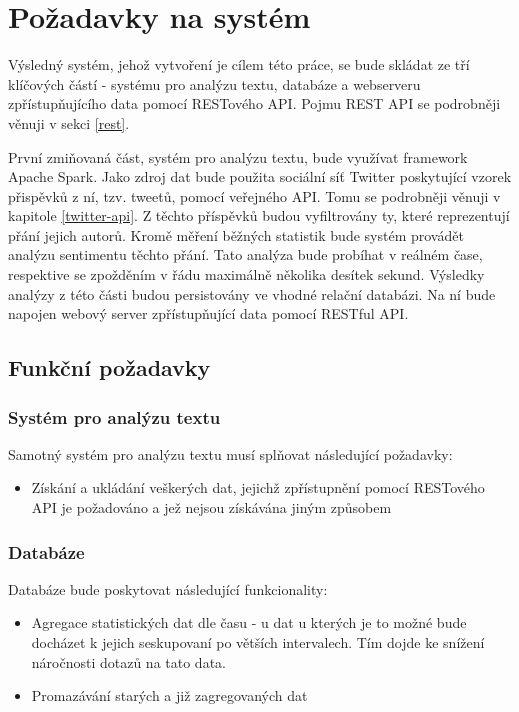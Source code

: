 \documentclass[thesis=B,czech]{FITthesis}[2012/06/26]
\begin{document}
\section{Požadavky na systém}
	Výsledný systém, jehož vytvoření je cílem této práce, se bude skládat ze tří klíčových částí - systému pro analýzu textu, databáze a webserveru zpřístupňujícího data pomocí RESTového API. Pojmu REST API se podrobněji věnuji v sekci \ref{rest}. 
	
	 První zmiňovaná část, systém pro analýzu textu, bude využívat framework Apache Spark. Jako zdroj dat bude použita sociální síť Twitter poskytující vzorek přispěvků z ní, tzv. tweetů, pomocí veřejného API. Tomu se podrobněji věnuji v kapitole \ref{twitter-api}. Z těchto příspěvků budou vyfiltrovány ty, které reprezentují přání jejich autorů. Kromě měření běžných statistik bude systém provádět analýzu sentimentu těchto přání. Tato analýza bude probíhat v reálném čase, respektive se zpožděním v řádu maximálně několika desítek sekund.  Výsledky analýzy z této části budou persistovány ve vhodné relační databázi. Na ní bude napojen webový server zpřístupňující data pomocí RESTful API. 

\subsection{Funkční požadavky}
\label{pozadavky}
\subsubsection{Systém pro analýzu textu}
Samotný systém pro analýzu textu musí splňovat následující požadavky:
\begin{itemize}
\item Získání a ukládání veškerých dat, jejichž zpřístupnění pomocí RESTového API je požadováno a jež nejsou získávána jiným způsobem
\end{itemize}
\subsubsection{Databáze}
 Databáze bude poskytovat následující funkcionality:
\begin{itemize}
\item Agregace statistických dat dle času - u dat u kterých je to možné bude docházet k jejich seskupovaní po větších intervalech. Tím dojde ke snížení náročnosti dotazů na tato data. 
\item Promazávání starých a již zagregovaných dat
\end{itemize}
\end{document}
